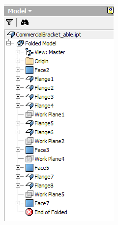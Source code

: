 \begin{minipage}{\linewidth}
\begin{minipage}[c]{0.62\linewidth}
\end{minipage}
\quad
\begin{minipage}[c]{0.3\linewidth}
\includegraphics[width=\linewidth,valign=t]{images/CommercialBracket_Defeatured_tree}
 \label{fig:results:CommercialBracket_Defeatured_tree}
\end{minipage}
\end{minipage}

